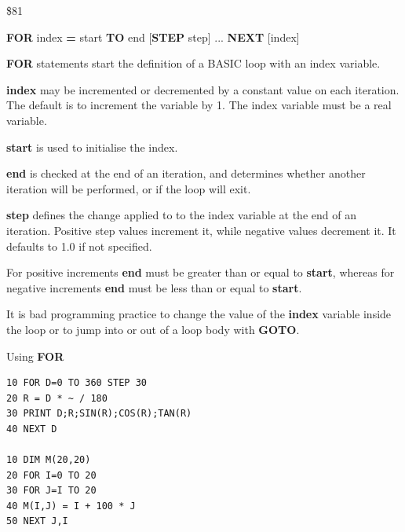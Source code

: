 \begin{description}[leftmargin=2cm,style=nextline]
\item [Token:] \$81
\item [Format:] {\bf FOR} index {\bf=} start {\bf TO} end
		[{\bf STEP} step] ... {\bf NEXT} [index]
\item [Usage:] {\bf FOR} statements start the definition
               of a BASIC loop with an index variable.

               {\bf index} may be incremented or decremented
               by a constant value on each iteration. The default
               is to increment the variable by 1.
               The index variable must be a real variable.

               {\bf start} is used to initialise the index.

               {\bf end} is checked at the end of an iteration,
               and determines whether another iteration will be performed,
               or if the loop will exit.

               {\bf step} defines the change applied to
               to the index variable at the end of an iteration.
               Positive step values increment it, while negative values
               decrement it. It defaults to 1.0 if not specified.

\item [Remarks:] For positive increments {\bf end} must be greater than
               or equal to {\bf start}, whereas for negative increments
               {\bf end} must be less than or equal to {\bf start}.

               It is bad programming practice to change the value
               of the {\bf index} variable inside the loop or to
               jump into or out of a loop body with {\bf GOTO}.

\item [Examples:] Using {\bf FOR}
\begin{tcolorbox}[colback=black,coltext=white]
\verbatimfont{\codefont}
\begin{verbatim}
10 FOR D=0 TO 360 STEP 30
20 R = D * ~ / 180
30 PRINT D;R;SIN(R);COS(R);TAN(R)
40 NEXT D

10 DIM M(20,20)
20 FOR I=0 TO 20
30 FOR J=I TO 20
40 M(I,J) = I + 100 * J
50 NEXT J,I
\end{verbatim}
\end{tcolorbox}
\end{description}


